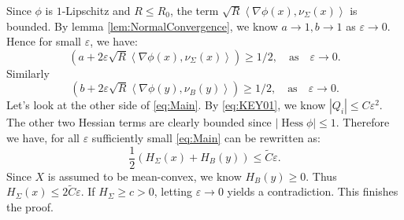 \documentclass[reqno, 11pt]{amsart}
\theoremstyle{plain}
\theoremstyle{definition}
\theoremstyle{remark}
\numberwithin{equation}{section}
\begin{document}
Since $\phi$ is $1$-Lipschitz and $R\le R_0$, the term $\sqrt{R} \left\langle \nabla\phi(x), \nu_{\Sigma}(x) \right\rangle$ is bounded. By lemma \ref{lem:NormalConvergence}, we know $a\to 1, b\to 1$ as $\varepsilon\to 0$. Hence for small $\varepsilon$, we have:
\begin{equation*}
	\left(a+2 \varepsilon \sqrt{R}  \left\langle \nabla \phi(x), \nu_{\Sigma}(x) \right\rangle \right )\ge 1/2,\quad  \text{as}\quad \varepsilon\to 0.
\end{equation*}
Similarly
\begin{equation*}
	\left(b+2 \varepsilon \sqrt{R}  \left\langle \nabla \phi(y), \nu_{B}(y) \right\rangle \right )\ge 1/2,\quad  \text{as}\quad \varepsilon\to 0.
\end{equation*}
Let's look at the other side of \eqref{eq:Main}. By \eqref{eq:KEY01}, we know $|Q_{i}|\le C \varepsilon^{2}$. The other two Hessian terms are clearly bounded since $|\operatorname{Hess}\phi |\le 1$. Therefore we have, for all $\varepsilon$ sufficiently small \eqref{eq:Main} can be rewritten as:
\begin{equation*}
	\frac{1}{2}(H_{\Sigma}(x)+H_{B}(y))\le \tilde{C} \varepsilon.
\end{equation*}
Since $X$ is assumed to be mean-convex, we know $H_{B}(y)\ge 0$. Thus $H_{\Sigma}(x)\le 2\tilde{C} \varepsilon$. If $H_{\Sigma}\ge c>0$, letting $\varepsilon\to 0$ yields a contradiction. This finishes the proof.



\end{document}
